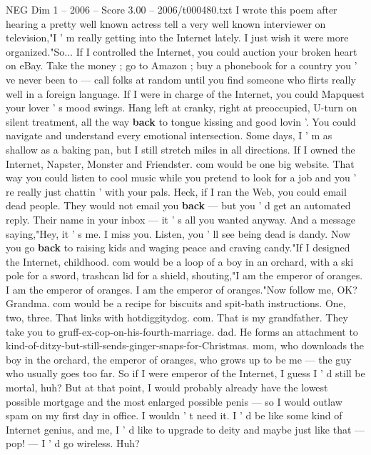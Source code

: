 \begin{textsample}{NEG Dim 1 – 2006 – Score 3.00 – 2006/t000480.txt}  \label{ex:f1_neg_068}
I wrote this poem after hearing a pretty well known actress tell a very well known interviewer on television,"I ' m really getting into the Internet lately.
I just wish it were more organized."So...
If I controlled the Internet, you could auction your broken heart on eBay.
Take the money ; go to Amazon ; buy a phonebook for a country you ' ve never been to — call folks at random until you find someone who flirts really well in a foreign language.
If I were in charge of the Internet, you could Mapquest your lover ' s mood swings.
Hang left at cranky, right at preoccupied, U-turn on silent treatment, all the way \textbf{back} to tongue kissing and good lovin '.
You could navigate and understand every emotional intersection.
Some days, I ' m as shallow as a baking pan, but I still stretch miles in all directions.
If I owned the Internet, Napster, Monster and Friendster. com would be one big website.
That way you could listen to cool music while you pretend to look for a job and you ' re really just chattin ' with your pals.
Heck, if I ran the Web, you could email dead people.
They would not email you \textbf{back} — but you ' d get an automated reply.
Their name in your inbox — it ' s all you wanted anyway.
And a message saying,"Hey, it ' s me.
I miss you.
Listen, you ' ll see being dead is dandy.
Now you go \textbf{back} to raising kids and waging peace and craving candy."If I designed the Internet, childhood. com would be a loop of a boy in an orchard, with a ski pole for a sword, trashcan lid for a shield, shouting,"I am the emperor of oranges.
I am the emperor of oranges.
I am the emperor of oranges."Now follow me, OK?
Grandma. com would be a recipe for biscuits and spit-bath instructions.
One, two, three.
That links with hotdiggitydog. com.
That is my grandfather.
They take you to gruff-ex-cop-on-his-fourth-marriage. dad.
He forms an attachment to kind-of-ditzy-but-still-sends-ginger-snaps-for-Christmas. mom, who downloads the boy in the orchard, the emperor of oranges, who grows up to be me — the guy who usually goes too far.
So if I were emperor of the Internet, I guess I ' d still be mortal, huh?
But at that point, I would probably already have the lowest possible mortgage and the most enlarged possible penis — so I would outlaw spam on my first day in office.
I wouldn ' t need it.
I ' d be like some kind of Internet genius, and me, I ' d like to upgrade to deity and maybe just like that — pop! — I ' d go wireless.
Huh?

\end{textsample}
